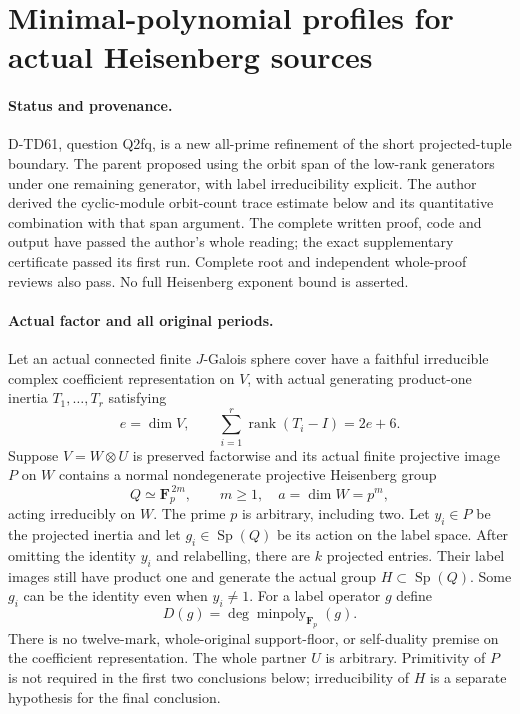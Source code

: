 \section{Minimal-polynomial profiles for actual Heisenberg sources}
\label{sec:heisenberg-minimal-polynomial}

\paragraph{Status and provenance.}
D-TD61, question Q2fq, is a new all-prime refinement of
the short projected-tuple boundary.
The parent proposed using the orbit span of the low-rank generators
under one remaining generator, with label irreducibility explicit.
The author derived the cyclic-module orbit-count trace estimate
below and its quantitative combination with that span argument.
The complete written proof, code and output have passed the author's
whole reading; the exact supplementary certificate passed its first run.
Complete root and independent whole-proof reviews also pass.
No full Heisenberg exponent bound is asserted.

\paragraph{Actual factor and all original periods.}
Let an actual connected finite $J$-Galois sphere cover have a faithful
irreducible complex coefficient representation on $V$, with actual
generating product-one inertia $T_1,\ldots,T_r$ satisfying
\[
 e=\dim V,\qquad
          \sum_{i=1}^r\operatorname{rank}(T_i-I)=2e+6 .
 \tag{HMP.1}
\]
Suppose $V=W\otimes U$ is preserved factorwise and its actual finite
projective image $P$ on $W$ contains a normal nondegenerate projective
Heisenberg group
\[
 Q\simeq\mathbf F_p^{\,2m},\qquad m\ge1,\quad
                      a=\dim W=p^m ,
 \tag{HMP.2}
\]
acting irreducibly on $W$.  The prime $p$ is arbitrary, including two.
Let $y_i\in P$ be the projected inertia and let
$g_i\in\operatorname{Sp}(Q)$ be its action on the label space.
After omitting the identity $y_i$ and relabelling, there are $k$
projected entries.  Their label images still have product one and
generate the actual group $H\subset\operatorname{Sp}(Q)$.
Some $g_i$ can be the identity even when $y_i\ne1$.
For a label operator $g$ define
\[
                    D(g)=\deg\operatorname{minpoly}_{\mathbf F_p}(g).
 \tag{HMP.3}
\]
There is no twelve-mark, whole-original support-floor, or self-duality
premise on the coefficient representation.  The whole partner $U$
is arbitrary.  Primitivity of $P$ is not required in the first two
conclusions below; irreducibility of $H$ is a separate hypothesis
for the final conclusion.


